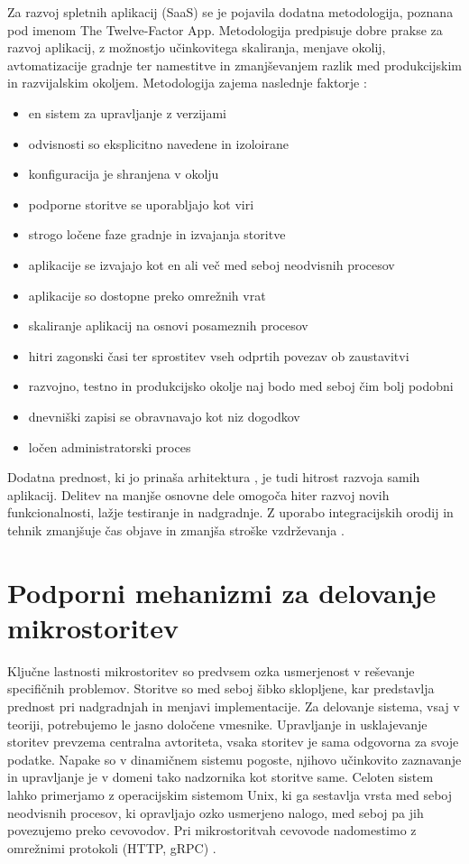 \documentclass[a4paper, 12pt]{book}
\begin{document}
Za razvoj spletnih aplikacij (SaaS) se je pojavila dodatna metodologija, poznana pod imenom The Twelve-Factor App.
Metodologija predpisuje dobre prakse za razvoj aplikacij, z možnostjo učinkovitega skaliranja, menjave okolij, avtomatizacije gradnje ter namestitve in zmanjševanjem razlik med produkcijskim in razvijalskim okoljem.
Metodologija zajema naslednje faktorje \cite{12factor}:
\begin{itemize}
	\item en sistem za upravljanje z verzijami
	\item odvisnosti so eksplicitno navedene in izoloirane
	\item konfiguracija je shranjena v okolju
	\item podporne storitve se uporabljajo kot viri
	\item strogo ločene faze gradnje in izvajanja storitve
	\item aplikacije se izvajajo kot en ali več med seboj neodvisnih procesov
	\item aplikacije so dostopne preko omrežnih vrat
	\item skaliranje aplikacij na osnovi posameznih procesov
	\item hitri zagonski časi ter sprostitev vseh odprtih povezav ob zaustavitvi
	\item razvojno, testno in produkcijsko okolje naj bodo med seboj čim bolj podobni
	\item dnevniški zapisi se obravnavajo kot niz dogodkov
	\item ločen administratorski proces
\end{itemize}

Dodatna prednost, ki jo prinaša arhitektura , je tudi hitrost razvoja samih aplikacij.
Delitev na manjše osnovne dele omogoča hiter razvoj novih funkcionalnosti, lažje testiranje in nadgradnje.
Z uporabo integracijskih orodij in tehnik zmanjšuje čas objave in zmanjša stroške vzdrževanja \cite{stine2015migrating}.


\section{Podporni mehanizmi za delovanje mikrostoritev}

Ključne lastnosti mikrostoritev so predvsem ozka usmerjenost v reševanje specifičnih problemov.
Storitve so med seboj šibko sklopljene, kar predstavlja prednost pri nadgradnjah in menjavi implementacije.
Za delovanje sistema, vsaj v teoriji, potrebujemo le jasno določene vmesnike.
Upravljanje in usklajevanje storitev prevzema centralna avtoriteta, vsaka storitev je sama odgovorna za svoje podatke.
Napake so v dinamičnem sistemu pogoste, njihovo učinkovito zaznavanje in upravljanje je v domeni tako nadzornika kot storitve same.
Celoten sistem lahko primerjamo z operacijskim sistemom Unix, ki ga sestavlja vrsta med seboj neodvisnih procesov, ki opravljajo ozko usmerjeno nalogo, med seboj pa jih povezujemo preko cevovodov.
Pri mikrostoritvah cevovode nadomestimo z omrežnimi protokoli (HTTP, gRPC) \cite{microservicesMartin}.
\end{document}
